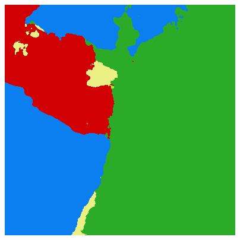 \begin{figure}
    \includegraphics[width=\UnetPredictionsImageWidth]{images/unet/unet-23D/138625-prediction}


\end{figure}
